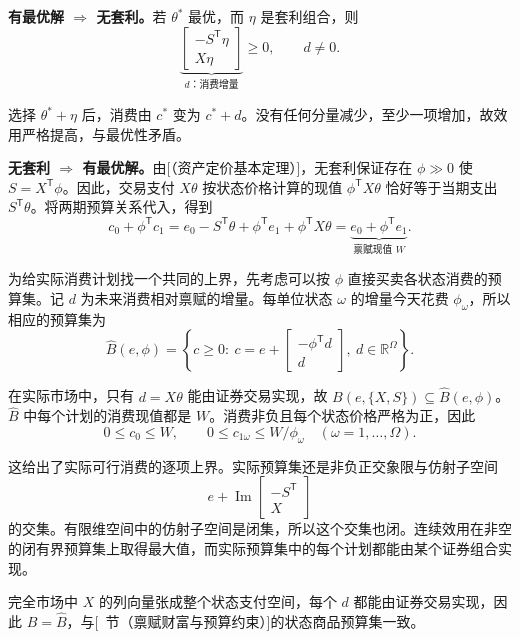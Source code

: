 \begin{solution}[label-content={证明},blank-type=none]
\textbf{有最优解 $\Rightarrow$ 无套利。}若 $\theta^*$ 最优，而 $\eta$ 是套利组合，则
\[
 \underbrace{\begin{bmatrix}-S^{\mathsf T}\eta\\X\eta\end{bmatrix}}_{d\text{：消费增量}}\ge0,\qquad d\ne0.
\]

选择 $\theta^*+\eta$ 后，消费由 $c^*$ 变为 $c^*+d$。没有任何分量减少，至少一项增加，故效用严格提高，与最优性矛盾。

\textbf{无套利 $\Rightarrow$ 有最优解。}由[（资产定价基本定理）]，无套利保证存在 $\phi\gg0$ 使 $S=X^{\mathsf T}\phi$。因此，交易支付 $X\theta$ 按状态价格计算的现值 $\phi^{\mathsf T}X\theta$ 恰好等于当期支出 $S^{\mathsf T}\theta$。将两期预算关系代入，得到
\[
 c_0+\phi^{\mathsf T}c_1
 =e_0-S^{\mathsf T}\theta+\phi^{\mathsf T}e_1+\phi^{\mathsf T}X\theta
 =\underbrace{e_0+\phi^{\mathsf T}e_1}_{\text{禀赋现值 }W}.
\]

为给实际消费计划找一个共同的上界，先考虑可以按 $\phi$ 直接买卖各状态消费的预算集。记 $d$ 为未来消费相对禀赋的增量。每单位状态 $\omega$ 的增量今天花费 $\phi_\omega$，所以相应的预算集为
\[
 \widehat B(e,\phi)=
 \left\{c\ge0:\ c=e+
 \begin{bmatrix}-\phi^{\mathsf T}d\\d\end{bmatrix},
 \ d\in\mathbb R^\Omega\right\}.
\]

在实际市场中，只有 $d=X\theta$ 能由证券交易实现，故 $B(e,\{X,S\})\subseteq\widehat B(e,\phi)$。$\widehat B$ 中每个计划的消费现值都是 $W$。消费非负且每个状态价格严格为正，因此
\[
 0\le c_0\le W,\qquad 0\le c_{1\omega}\le W/\phi_\omega
 \quad(\omega=1,\ldots,\Omega).
\]

这给出了实际可行消费的逐项上界。实际预算集还是非负正交象限与仿射子空间
\[
 e+\operatorname{Im}\begin{bmatrix}-S^{\mathsf T}\\X\end{bmatrix}
\]
的交集。有限维空间中的仿射子空间是闭集，所以这个交集也闭。连续效用在非空的闭有界预算集上取得最大值，而实际预算集中的每个计划都能由某个证券组合实现。
\end{solution}

完全市场中 $X$ 的列向量张成整个状态支付空间，每个 $d$ 都能由证券交易实现，因此 $B=\widehat B$，与[~节（禀赋财富与预算约束）]的状态商品预算集一致。

